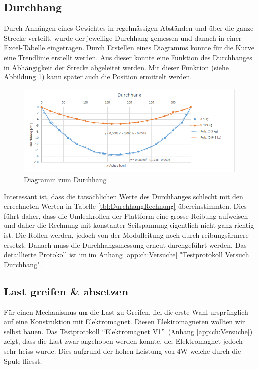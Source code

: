 \documentclass[a4paper]{report}
\begin{document}
\subsection{Durchhang}
\label{ssec:VersDurch}
Durch Anhängen eines Gewichtes in regelmässigen Abständen und über die ganze Strecke verteilt, wurde der jeweilige Durchhang gemessen und danach in einer Excel-Tabelle eingetragen. Durch Erstellen eines Diagramms konnte für die Kurve eine Trendlinie erstellt werden. Aus dieser konnte eine Funktion des Durchhanges in Abhängigkeit der Strecke abgeleitet werden. Mit dieser Funktion (siehe Abbildung \ref{fig:Durchhang_v1}) kann später auch die Position ermittelt werden.
\begin{figure}[h!]
	\centering
	\includegraphics[width=\textwidth,keepaspectratio]{Durchhang_v1}
	\caption{Diagramm zum Durchhang}
	\label{fig:Durchhang_v1}
\end{figure}

Interessant ist, dass die tatsächlichen Werte des Durchhanges schlecht mit den errechneten Werten in Tabelle \ref{tbl:DurchhangRechnung} übereinstimmten. Dies führt daher, dass die Umlenkrollen der Plattform eine grosse Reibung aufweisen und daher die Rechnung mit konstanter Seilspannung eigentlich nicht ganz richtig ist. Die Rollen werden, jedoch von der Modulleitung noch durch reibungsärmere ersetzt. Danach muss die Durchhangsmessung erneut durchgeführt werden. Das detaillierte Protokoll ist im im Anhang \ref{app:ch:Versuche} "Testprotokoll Versuch Durchhang".

\subsection{Last greifen \& absetzen}
\label{ssec:VersLastg}

Für einen Mechanismus um die Last zu Greifen, fiel die erste Wahl ursprünglich auf eine Konstruktion mit Elektromagnet. Diesen Elektromagneten wollten wir selbst bauen. Das Testprotokoll \textquotedblleft Elektromagnet V1\textquotedblright\ (Anhang \ref{app:ch:Versuche}) zeigt, dass die Last zwar angehoben werden konnte, der Elektromagnet jedoch sehr heiss wurde. Dies aufgrund der hohen Leistung von 4W welche durch die Spule fliesst.
\end{document}
